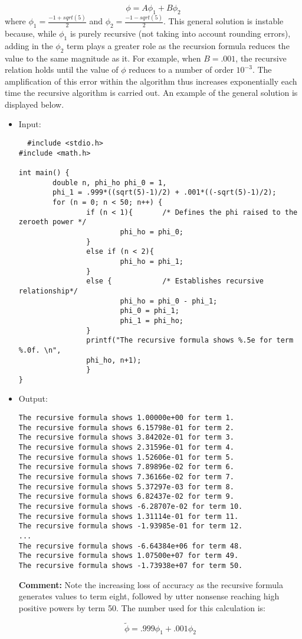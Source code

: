 \documentclass[10pt]{article}
\begin{document}
$$\phi = A\phi_1 + B\phi_2$$
where $\phi_1 = \frac{-1 + sqrt(5)}{2}$ and $\phi_2 = \frac{-1 - sqrt(5)}{2}$. This general solution is instable because, while $\phi_1$ is purely  recursive (not taking into account rounding errors), adding in the $\phi_2$ term plays a greater role as the recursion formula reduces the value to the same magnitude as it. For example, when $B = .001$, the recursive relation holds until the value of $\phi$ reduces to a number of order $10^{-3}$. The amplification of this error within the algorithm thus increases exponentially each time the recursive algorithm is carried out. An example of the general solution is displayed below.

\begin{itemize}
 \item Input:
 
 \begin{verbatim}
  #include <stdio.h>
#include <math.h>

int main() {
        double n, phi_ho phi_0 = 1, 
        phi_1 = .999*((sqrt(5)-1)/2) + .001*((-sqrt(5)-1)/2); 
        for (n = 0; n < 50; n++) {
                if (n < 1){       /* Defines the phi raised to the zeroeth power */
                        phi_ho = phi_0;
                }
                else if (n < 2){
                        phi_ho = phi_1;
                }
                else {            /* Establishes recursive relationship*/
                        phi_ho = phi_0 - phi_1;   
                        phi_0 = phi_1;
                        phi_1 = phi_ho;
                }
                printf("The recursive formula shows %.5e for term %.0f. \n", 
                phi_ho, n+1);
                }
}
\end{verbatim}
\item Output:
\begin{verbatim}
The recursive formula shows 1.00000e+00 for term 1. 
The recursive formula shows 6.15798e-01 for term 2. 
The recursive formula shows 3.84202e-01 for term 3. 
The recursive formula shows 2.31596e-01 for term 4. 
The recursive formula shows 1.52606e-01 for term 5. 
The recursive formula shows 7.89896e-02 for term 6. 
The recursive formula shows 7.36166e-02 for term 7. 
The recursive formula shows 5.37297e-03 for term 8. 
The recursive formula shows 6.82437e-02 for term 9. 
The recursive formula shows -6.28707e-02 for term 10. 
The recursive formula shows 1.31114e-01 for term 11. 
The recursive formula shows -1.93985e-01 for term 12. 
...
The recursive formula shows -6.64384e+06 for term 48. 
The recursive formula shows 1.07500e+07 for term 49. 
The recursive formula shows -1.73938e+07 for term 50. 
\end{verbatim}
\textbf{Comment:} Note the increasing loss of accuracy as the recursive formula generates values to term eight, followed by utter nonsense reaching high positive powers by term 50. The number used for this calculation is:

$$\tilde{\phi} = .999\phi_1 + .001\phi_2$$

\end{itemize}
\end{document}
